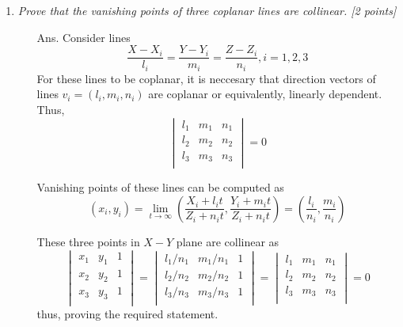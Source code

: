 \documentclass[11pt]{article}
\begin{document}
\begin{enumerate}
\item \textit{Prove that the vanishing points of three coplanar lines are collinear. \textsf{[2 points]}}
\begin{itemize}
	\item[Ans.] Consider lines 
	\[
		\frac{X-X_i}{l_i} = \frac{Y-Y_i}{m_i} = \frac{Z-Z_i}{n_i}, i = 1,2,3
	\]
	For these lines to be coplanar, it is neccesary that direction vectors of lines $v_i = (l_i,m_i,n_i)$ are coplanar or equivalently, linearly dependent. Thus,
		\[
		\begin{vmatrix}
		l_1& m_1& n_1	\\
		l_2& m_2& n_2	\\
		l_3& m_3& n_3	\\	
		\end{vmatrix}
		  = 0
		\]

	Vanishing points of these lines can be computed as
	\[
		(x_i,y_i) = \lim_{t \to \infty} \left (\frac{X_i+l_it}{Z_i+n_it},\frac{Y_i+m_it}{Z_i+n_it}\right )
				  = \left (\frac{l_i}{n_i}, \frac{m_i}{n_i}\right )
	\]

	These three points in $X-Y$ plane are collinear as 
	\[
		\begin{vmatrix}
		x_1& y_1& 1	\\
		x_2& y_2& 1	\\
		x_3& y_3& 1 \\	
		\end{vmatrix}
		  = 
		\begin{vmatrix}
		l_1/n_1& m_1/n_1& 1	\\
		l_2/n_2& m_2/n_2& 1	\\
		l_3/n_3& m_3/n_3& 1	\\	
		\end{vmatrix}
		  =		
		\begin{vmatrix}
		l_1& m_1& n_1	\\
		l_2& m_2& n_2	\\
		l_3& m_3& n_3	\\	
		\end{vmatrix}
		  = 0
	\]
	thus, proving the required statement.
\end{itemize}


\end{enumerate}
\end{document}
